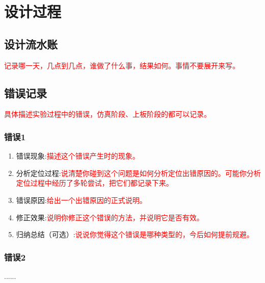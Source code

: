 \section{设计过程}
\subsection{设计流水账}
\textcolor{red}{记录哪一天，几点到几点，谁做了什么事，结果如何。事情不要展开来写。}

\subsection{错误记录}
\textcolor{red}{具体描述实验过程中的错误，仿真阶段、上板阶段的都可以记录。}

\subsubsection{错误1}
\begin{enumerate}[(1)]
    \item 错误现象:\textcolor{red}{描述这个错误产生时的现象。}
    \item 分析定位过程:\textcolor{red}{说清楚你碰到这个问题是如何分析定位出错原因的。可能你分析定位过程中经历了多轮尝试，把它们都记录下来。}
    \item 错误原因:\textcolor{red}{给出一个出错原因的正式说明。}
    \item 修正效果:\textcolor{red}{说明你修正这个错误的方法，并说明它是否有效。}
    \item 归纳总结（可选）:\textcolor{red}{说说你觉得这个错误是哪种类型的，今后如何提前规避。}
\end{enumerate}

\subsubsection{错误2}
......